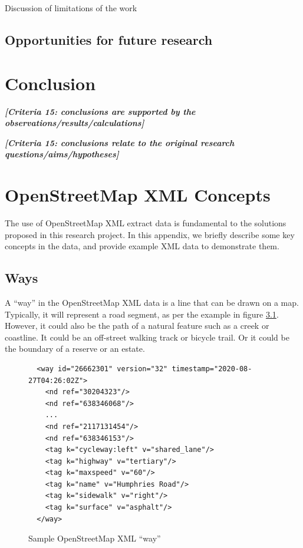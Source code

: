 \documentclass[11pt,twoside]{report}
\newcommand{\remark}[1]{{\bf \em [\marginpar{$\Leftarrow$}#1]}}
\begin{document}
Discussion of limitations of the work


\section{Opportunities for future research}
\label{s:future_work}




\chapter{Conclusion}

\remark{Criteria 15: conclusions are supported by the observations/results/calculations}

\remark{Criteria 15: conclusions relate to the original research questions/aims/hypotheses}
\appendix


\chapter{OpenStreetMap XML Concepts}
\label{a:osm_concepts}

The use of OpenStreetMap XML extract data is fundamental to the solutions proposed in this research project.  In this appendix, we briefly describe some key concepts in the data, and provide example XML data to demonstrate them.

\section{Ways}
\label{osm:ways}

A ``way'' in the OpenStreetMap XML data is a line that can be drawn on a map.  Typically, it will represent a road segment, as per the example in figure \ref{xml:way_st}.  However, it could also be the path of a natural feature such as a creek or coastline.  It could be an off-street walking track or bicycle trail.  Or it could be the boundary of a reserve or an estate.

\begin{figure}[t]
\centering
\begin{verbatim}
  <way id="26662301" version="32" timestamp="2020-08-27T04:26:02Z">
    <nd ref="30204323"/>
    <nd ref="638346068"/>
    ...
    <nd ref="2117131454"/>
    <nd ref="638346153"/>
    <tag k="cycleway:left" v="shared_lane"/>
    <tag k="highway" v="tertiary"/>
    <tag k="maxspeed" v="60"/>
    <tag k="name" v="Humphries Road"/>
    <tag k="sidewalk" v="right"/>
    <tag k="surface" v="asphalt"/>
  </way>
\end{verbatim}
\caption{Sample OpenStreetMap XML ``way''}
\label{xml:way_st}
\end{figure}
\end{document}
